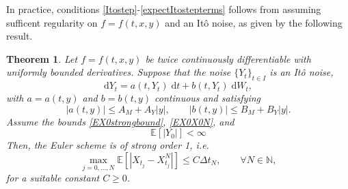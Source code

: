 \documentclass[reqno,12pt]{amsart}
\theoremstyle{plain}%
\newtheorem{thm}{Theorem}[section]
\theoremstyle{definition}
\begin{document}
In practice, conditions \eqref{Itostep}-\eqref{expectItostepterms} follows from assuming sufficent regularity on $f=f(t, x, y)$ and an It\^o noise, as given by the following result.
\begin{thm}
    \label{thmItonoise}
    Let $f=f(t, x, y)$ be twice continuously differentiable with uniformly bounded derivatives. Suppose that the noise $\{Y_t\}_{t\in I}$ is an It\^o noise,
    \begin{equation}
        \label{YtItonoise}
        \mathrm{d}Y_t = a(t, Y_t)\;\mathrm{d}t + b(t, Y_t)\;\mathrm{d}W_t,
    \end{equation}
    with $a=a(t, y)$ and $b=b(t, y)$ continuous and satisfying
    \begin{equation}
        \label{Itonoiseterms}
        |a(t, y)| \leq A_M + A_Y |y|, \qquad |b(t, y)| \leq B_M + B_Y|y|.
    \end{equation}
    Assume the bounds \eqref{EX0strongbound}, \eqref{EX0X0N}, and
    \begin{equation}
        \label{YtItonoiseinitialcondition}
        \mathbb{E}[|Y_0|] < \infty
    \end{equation}
    Then, the Euler scheme is of strong order 1, i.e.
    \begin{equation}
        \max_{j=0, \ldots, N}\mathbb{E}\left[ \left| X_{t_j} - X_{t_j}^N \right| \right] \leq C \Delta t_N, \qquad \forall N \in \mathbb{N},
    \end{equation}
  for a suitable constant $C \geq 0$.
\end{thm}
\end{document}
